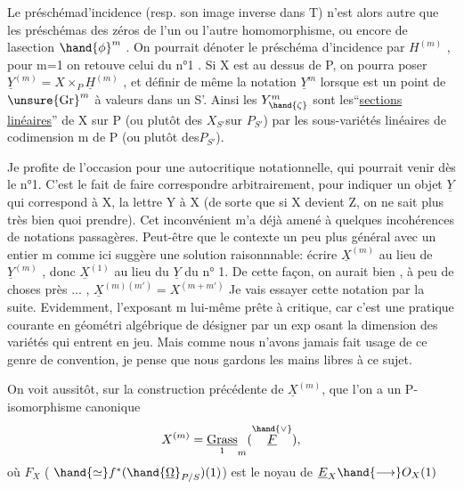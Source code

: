 
Le préschémad'incidence  (resp. son image inverse dans T) n'est alors
autre que les préschémas des zéros de l'un ou l'autre homomorphisme,
ou encore de lasection $\hand{\phi}^{m}$ .  On pourrait dénoter le préschéma
d'incidence par $H^{(m)}$ , pour m=1 on retouve celui du n°1 .  Si X est
au dessus de P, on pourra poser $\underline{Y}^{(m)} = X\times_{P} \underline{H}^{(m)}$ ,  et définir de même
la notation $\underline{Y}^{m}$ lorsque \hand{$\zeta$} est un point de $\unsure{\mathrm{Gr}}^{m}$ à valeurs dans un S'.
Ainsi les  $Y^{m}_{\hand{\zeta}}$  sont les``\uline{sections} \uline{linéaires}''  de X sur P (ou plutôt des
$X_{S'}$sur $P_{S'}$)   par les sous-variétés linéaires de codimension m de P (ou
plutôt des$P_{S'}$).

\placedmargin{$|$}Je profite de l'occasion pour une  autocritique notationnelle,
qui pourrait venir dès le n°1. C'est le fait  de faire correspondre
arbitrairement, pour indiquer un objet $\underline{Y}$ qui correspond à X, la lettre
Y à X  (de sorte que si X devient Z, on ne sait plus très bien quoi
prendre). Cet inconvénient m'a déjà amené à quelques incohérences de
notations passagères.  Peut-être que le contexte un peu plus général
avec un entier m comme ici suggère une solution raisonnnable: écrire
$\underline{X}^{(m)}$ au lieu de  $\underline{Y}^{(m)}$ , donc  $\underline{X}^{(1)}$ au lieu du  $\underline{Y}$  du n° 1. De cette
façon, on  aurait bien , à peu de choses près ... ,  $\underline{X}^{(m)(m')} = X^{(m+m')}$
Je vais essayer cette notation par la suite.  Evidemment, l'exposant m
lui-même prête à critique, car  c'est une pratique courante en géométri
algébrique de désigner par un exp osant la dimension des variétés qui
entrent en jeu. Mais comme nous n'avons jamais fait usage de ce genre
de convention, je pense que nous gardons les mains libres à ce sujet.

On voit aussitôt, sur la construction précédente de $\underline{X}^{(m)}$, que
l'on a un P-isomorphisme canonique
\[ X^{(m)} = \underset{1}{\underline{\mathrm{Grass}}}_{m}(\overset{\hand{\vee}}{\underline{F}}) , \]
où  $F_{X}$  ( $\hand{\simeq} f^{*}(\hand{\underline{\Omega}}_{P/S})(1)$)   est le noyau de  $\underline{E}_{X} \hand{\longrightarrow} O_{X}(1)$\hand{,}


